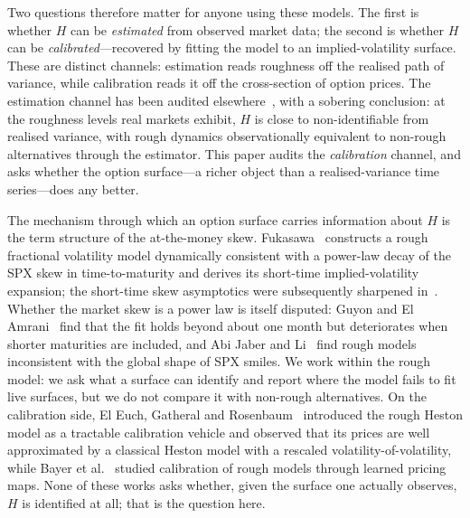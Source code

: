 \documentclass[11pt]{article}
\begin{document}
Two questions therefore matter for anyone using these models. The first is whether $H$ can
be \emph{estimated} from observed market data; the second is whether $H$ can be
\emph{calibrated}---recovered by fitting the model to an implied-volatility surface. These
are distinct channels: estimation reads roughness off the realised path of variance, while
calibration reads it off the cross-section of option prices. The estimation channel has been
audited elsewhere~\cite{lumor_identifiability}, with a sobering conclusion: at the roughness
levels real markets exhibit,
$H$ is close to non-identifiable from realised variance, with rough dynamics observationally
equivalent to non-rough alternatives through the estimator. This paper audits the
\emph{calibration} channel, and asks whether the option surface---a richer object than a
realised-variance time series---does any better.

The mechanism through which an option surface carries information about $H$ is the term
structure of the at-the-money skew. Fukasawa~\cite{fukasawa2017} constructs a rough
fractional volatility model dynamically consistent with a power-law decay of the SPX skew
in time-to-maturity and derives its short-time implied-volatility expansion; the
short-time skew asymptotics were subsequently sharpened in~\cite{bfghs2019,efgr2019}.
Whether the market skew is a power law is itself disputed: Guyon and
El Amrani~\cite{guyonelamrani2023} find that the fit holds beyond about one month but
deteriorates when shorter maturities are included, and Abi Jaber and
Li~\cite{abijaberli2025} find rough models inconsistent with the global shape of SPX
smiles. We work within the rough model: we ask what a surface can identify and report
where the model fails to fit live surfaces, but we do not compare it with non-rough
alternatives. On
the calibration side, El Euch, Gatheral and Rosenbaum~\cite{egr2019} introduced the rough
Heston model as a tractable calibration vehicle and observed that its prices are well
approximated by a classical Heston model with a rescaled volatility-of-volatility, while
Bayer et al.~\cite{bhmst2019} studied calibration of rough models through learned pricing
maps. None of these works asks whether, given the surface one actually observes, $H$ is
identified at all; that is the question here.
\end{document}
